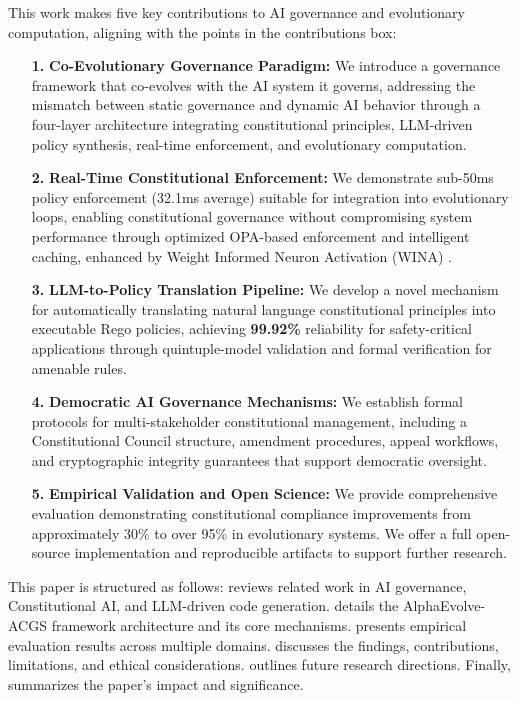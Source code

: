 \documentclass[manuscript,screen,review,anonymous,9pt]{acmart}
\begin{document}
This work makes five key contributions to AI governance and evolutionary computation, aligning with the points in the contributions box:
\begin{enumerate}[leftmargin=*,itemsep=1pt,parsep=1pt]
    \item[\textbf{1.}] \textbf{Co-Evolutionary Governance Paradigm:} We introduce a governance framework that co-evolves with the AI system it governs, addressing the mismatch between static governance and dynamic AI behavior through a four-layer architecture integrating constitutional principles, LLM-driven policy synthesis, real-time enforcement, and evolutionary computation.
    \item[\textbf{2.}] \textbf{Real-Time Constitutional Enforcement:} We demonstrate sub-50ms policy enforcement (32.1ms average) suitable for integration into evolutionary loops, enabling constitutional governance without compromising system performance through optimized OPA-based enforcement and intelligent caching, enhanced by Weight Informed Neuron Activation (WINA) \cite{WINA2024NeuronActivation}.
    \item[\textbf{3.}] \textbf{LLM-to-Policy Translation Pipeline:} We develop a novel mechanism for automatically translating natural language constitutional principles into executable Rego policies, achieving \textbf{99.92\%} reliability for safety-critical applications through quintuple-model validation and formal verification for amenable rules.
    \item[\textbf{4.}] \textbf{Democratic AI Governance Mechanisms:} We establish formal protocols for multi-stakeholder constitutional management, including a Constitutional Council structure, amendment procedures, appeal workflows, and cryptographic integrity guarantees that support democratic oversight.
    \item[\textbf{5.}] \textbf{Empirical Validation and Open Science:} We provide comprehensive evaluation demonstrating constitutional compliance improvements from approximately 30\% to over 95\% in evolutionary systems. We offer a full open-source implementation and reproducible artifacts to support further research.
\end{enumerate}

This paper is structured as follows:  reviews related work in AI governance, Constitutional AI, and LLM-driven code generation.  details the AlphaEvolve-ACGS framework architecture and its core mechanisms.  presents empirical evaluation results across multiple domains.  discusses the findings, contributions, limitations, and ethical considerations.  outlines future research directions. Finally,  summarizes the paper's impact and significance.
\end{document}
